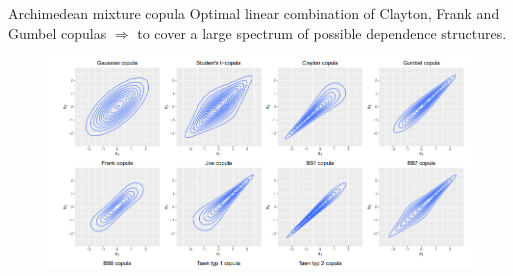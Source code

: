 \documentclass[pdf,10pt,xcolor=dvipsnames,hide notes]{beamer}
\begin{document}
\begin{frame}

\begin{exampleblock}{Archimedean mixture copula}
Optimal linear combination of Clayton, Frank and Gumbel copulas $\Rightarrow$ to cover a large spectrum of possible dependence structures.
\end{exampleblock}

\begin{figure}[htbp]
\centering
\includegraphics[scale=0.5]{taildep.png}
\label{fig:fig1}
\end{figure}

\end{frame}
	
%		
%		
		
%			
%				
%			
%					
	
\end{document}
